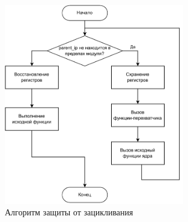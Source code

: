 \begin{figure}[h]
	\centering
	\includegraphics[width=0.7\textwidth]{inc/alg3.drawio.pdf}
	\caption{Алгоритм защиты от зацикливания}
	\label{alg2}
\end{figure}

